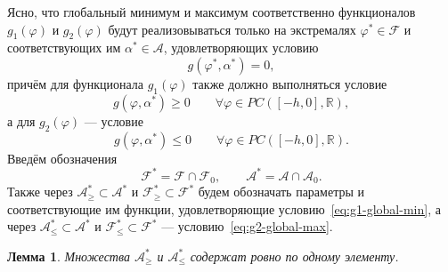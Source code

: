 \documentclass[a4paper,14pt]{article}
\newtheorem{lemma}{Лемма}
\theoremstyle{definition}
\begin{document}
Ясно, что глобальный минимум и максимум соответственно функционалов $g_1(\varphi)$ и
$g_2(\varphi)$ будут реализовываться только на экстремалях $\varphi^* \in \mathcal{F}$
и соответствующих им $\alpha^* \in \mathcal{A}$, удовлетворяющих условию
\begin{equation}
  \label{eq:g=0}
  g(\varphi^*, \alpha^*) = 0,
\end{equation}
причём для функционала $g_1(\varphi)$ также должно выполняться условие
\begin{equation}
  \label{eq:g1-global-min}
  g(\varphi, \alpha^*) \geqslant 0 \qquad \forall \varphi \in PC([-h, 0], \mathbb{R}),
\end{equation}
а для $g_2(\varphi)$ --- условие
\begin{equation}
  \label{eq:g2-global-max}
  g(\varphi, \alpha^*) \leqslant 0 \qquad \forall \varphi \in PC([-h, 0], \mathbb{R}).
\end{equation}
Введём обозначения
\begin{equation*}
  \mathcal{F}^* = \mathcal{F} \cap \mathcal{F}_0,
  \qquad
  \mathcal{A}^* = \mathcal{A} \cap \mathcal{A}_0.
\end{equation*}
Также через $\mathcal{A}_\geqslant^* \subset \mathcal{A}^*$ и
$\mathcal{F}_\geqslant^* \subset \mathcal{F}^*$ будем обозначать параметры
и соответствующие им функции, удовлетворяющие условию~\eqref{eq:g1-global-min}, а через
$\mathcal{A}_\leqslant^* \subset \mathcal{A}^*$ и
$\mathcal{F}_\leqslant^* \subset \mathcal{F}^*$ --- условию~\eqref{eq:g2-global-max}.

\begin{lemma}
  Множества $\mathcal{A}_\geqslant^*$ и $\mathcal{A}_\leqslant^*$
  содержат ровно по одному элементу.
\end{lemma}
\end{document}
